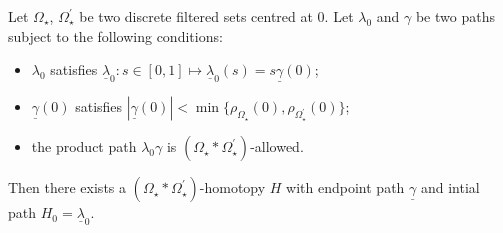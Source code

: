 \documentclass[11pt, english]{smfart}
\theoremstyle{definition}
\begin{document}
\begin{lemm}\label{mainlem2forusuconv}
Let $\Omega_\star$, $\Omega_\star^\prime$ be two discrete filtered
sets centred at $0$. Let $\lambda_0$ and $\gamma$ be two paths 
subject to the following conditions:
\begin{itemize}
\item  $\lambda_0$ satisfies $\underline{\lambda}_0 : s \in [0,1] \mapsto
  \underline{\lambda}_0 (s)=s\underline{\gamma} (0)$;
\item $\underline{\gamma}(0)$ satisfies $|\underline{\gamma}(0)| <
  \min \{\rho_{\Omega_\star}(0) , \rho_{\Omega_\star^\prime}(0) \}$;
\item the product path $\lambda_0 \gamma$ is 
$(\Omega_\star \ast \Omega_\star^\prime)$-allowed.
\end{itemize}
Then there exists a $(\Omega_\star \ast
\Omega_\star^\prime)$-homotopy  $H$ with endpoint path $\underline{\gamma}$ and
intial path  ${H_0 = \underline{\lambda}_0}$.
\end{lemm}
\end{document}
